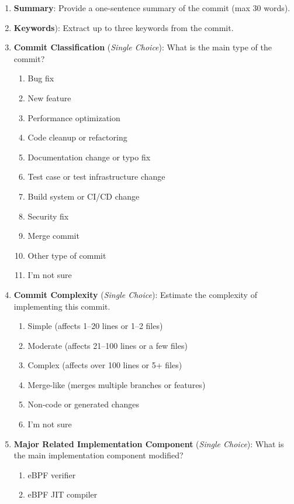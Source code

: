\begin{enumerate}
    \item \textbf{Summary}: Provide a one-sentence summary of the commit (max 30 words).
    \item \textbf{Keywords}): Extract up to three keywords from the commit.
    \item \textbf{Commit Classification} (\emph{Single Choice}): What is the main type of the commit?
    \begin{enumerate}[label=(\alph*)]
        \item Bug fix
        \item New feature
        \item Performance optimization
        \item Code cleanup or refactoring
        \item Documentation change or typo fix
        \item Test case or test infrastructure change
        \item Build system or CI/CD change
        \item Security fix
        \item Merge commit
        \item Other type of commit
        \item I'm not sure
    \end{enumerate}
    \item \textbf{Commit Complexity} (\emph{Single Choice}): Estimate the complexity of implementing this commit.
    \begin{enumerate}[label=(\alph*)]
        \item Simple (affects 1--20 lines or 1--2 files)
        \item Moderate (affects 21--100 lines or a few files)
        \item Complex (affects over 100 lines or 5+ files)
        \item Merge-like (merges multiple branches or features)
        \item Non-code or generated changes
        \item I'm not sure
    \end{enumerate}
    \item \textbf{Major Related Implementation Component} (\emph{Single Choice}): What is the main implementation component modified?
    \begin{enumerate}[label=(\alph*)]
        \item eBPF verifier
        \item eBPF JIT compiler

\end{enumerate}
\end{enumerate}
